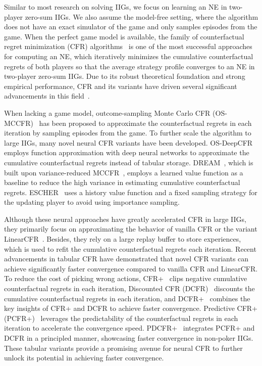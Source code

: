 \documentclass[letterpaper]{article} %
\begin{document}
Similar to most research on solving IIGs, we focus on learning an NE in two-player zero-sum IIGs. We also assume the model-free setting, where the algorithm does not have an exact simulator of the game and only samples episodes from the game. When the perfect game model is available, the family of counterfactual regret minimization (CFR) algorithms~\cite{zinkevich_regret_2007,tammelin_solving_2014,brown_solving_2019,farina2021faster} is one of the most successful approaches for computing an NE, which iteratively minimizes the cumulative counterfactual regrets of both players so that the average strategy profile converges to an NE in two-player zero-sum IIGs. Due to its robust theoretical foundation and strong empirical performance, CFR and its variants have driven several significant advancements in this field~\cite{bowling_heads-up_2015,moravvcik2017deepstack,brown2018superhuman,brown2019superhuman}. 

When lacking a game model, outcome-sampling Monte Carlo CFR (OS-MCCFR)~\cite{lanctot2009monte} has been proposed to approximate the counterfactual regrets in each iteration by sampling episodes from the game. To further scale the algorithm to large IIGs, many novel neural CFR variants have been developed. OS-DeepCFR~\cite{brown2019deep} employs function approximation with deep neural networks to approximate the cumulative counterfactual regrets instead of tabular storage. DREAM~\cite{steinberger2020dream}, which is built upon variance-reduced MCCFR~\cite{schmid2019variance}, employs a learned value function as a baseline to reduce the high variance in estimating cumulative counterfactual regrets. ESCHER~\cite{ESCHER} uses a history value function and a fixed sampling strategy for the updating player to avoid using importance sampling.

Although these neural approaches have greatly accelerated CFR in large IIGs, they primarily focus on approximating the behavior of vanilla CFR or the variant LinearCFR~\cite{brown_solving_2019}. Besides, they rely on a large replay buffer to store experiences, which is used to refit the cumulative counterfactual regrets each iteration. Recent advancements in tabular CFR have demonstrated that novel CFR variants can achieve significantly faster convergence compared to vanilla CFR and LinearCFR. To reduce the cost of picking wrong actions, CFR+~\cite{tammelin_solving_2014} clips negative cumulative counterfactual regrets in each iteration, Discounted CFR (DCFR)~\cite{farina2021faster} discounts the cumulative counterfactual regrets in each iteration, and DCFR+~\cite{AutoCFR} combines the key insights of CFR+ and DCFR to achieve faster convergence. Predictive CFR+ (PCFR+)~\cite{farina2021faster} leverages the predictability of the counterfactual regrets in each iteration to accelerate the convergence speed. PDCFR+~\cite{PDCFRPlus} integrates PCFR+ and DCFR in a principled manner, showcasing faster convergence in non-poker IIGs. These tabular variants provide a promising avenue for neural CFR to further unlock its potential in achieving faster convergence.
\end{document}
